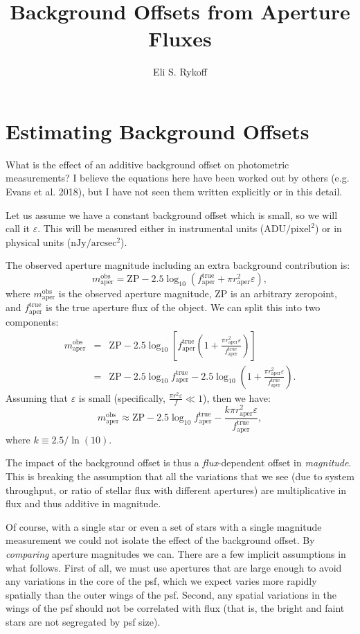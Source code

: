 \documentclass{article}
\newcommand{\obs}{\mathrm{obs}}
\newcommand{\aper}{\mathrm{aper}}
\newcommand{\true}{\mathrm{true}}
\newcommand{\bkgoffset}{\varepsilon}
\newcommand{\ZP}{\mathrm{ZP}}
\begin{document}
\title{Background Offsets from Aperture Fluxes}
\author{Eli S. Rykoff}

\section{Estimating Background Offsets}

What is the effect of an additive background offset on photometric
measurements?  I believe the equations here have been worked out by others
(e.g. Evans et al. 2018), but I have not seen them written explicitly or in
this detail.

Let us assume we have a constant background offset which is small, so we will
call it $\bkgoffset$.  This will be measured either in instrumental units
($\mathrm{ADU}/\mathrm{pixel}^2$) or in physical units
($\mathrm{nJy}/\mathrm{arcsec}^2$).

The observed aperture magnitude including an extra background contribution is:
%
\begin{equation}
  m_\aper^\obs = \ZP - 2.5\log_{10}(f_\aper^\true + \pi r_\aper^2 \bkgoffset),
\end{equation}
%
where $m_\aper^\obs$ is the observed aperture magnitude, $\ZP$ is an arbitrary zeropoint, and
$f_\aper^\true$ is the true aperture flux of the object.  We can split this
into two components:
%
\begin{eqnarray}
  m_\aper^\obs &=& \ZP - 2.5\log_{10}\left [ f_\aper^\true \left ( 1 + \frac{\pi
      r_\aper^2 \bkgoffset}{f_\aper^\true} \right ) \right ]\\
  &=& \ZP - 2.5\log_{10}f_\aper^\true - 2.5\log_{10} \left ( 1 + \frac{\pi
    r_\aper^2 \bkgoffset}{f_\aper^\true} \right ).
\end{eqnarray}
%
Assuming that $\bkgoffset$ is small (specifically, $\frac{\pi r^2
  \bkgoffset}{f} \ll 1$), then we have:
%
\begin{equation}
  m_\aper^\obs \approx \ZP - 2.5\log_{10}f_\aper^\true - \frac{k \pi
    r_\aper^2 \bkgoffset}{f_\aper^\true},
\end{equation}
%
where $k \equiv 2.5/\ln(10)$.

The impact of the background offset is thus a \emph{flux}-dependent offset in
\emph{magnitude}.  This is breaking the assumption that all the variations that
we see (due to system throughput, or ratio of stellar flux with different
apertures) are multiplicative in flux and thus additive in magnitude.

Of course, with a single star or even a set of stars with a single magnitude
measurement we could not isolate the effect of the background offset.  By
\emph{comparing} aperture magnitudes we can.  There are a few implicit
assumptions in what follows.  First of all, we must use apertures that are
large enough to avoid any variations in the core of the psf, which we expect
varies more rapidly spatially than the outer wings of the psf.  Second, any
spatial variations in the wings of the psf should not be correlated with flux
(that is, the bright and faint stars are not segregated by psf size).
\end{document}
